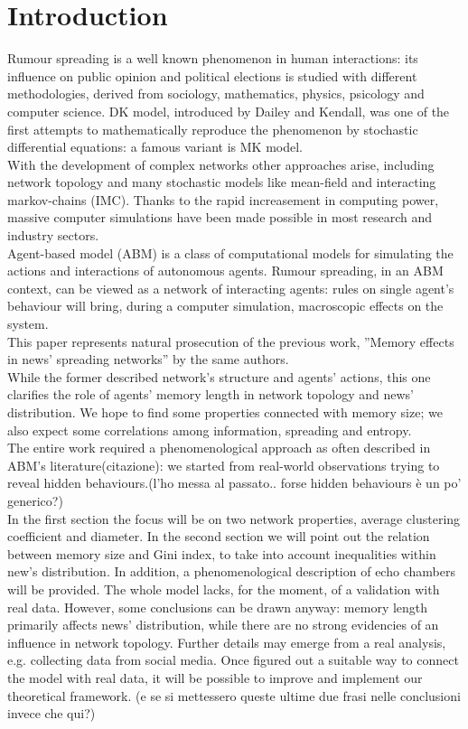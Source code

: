 \section{Introduction} \label{introduction}
Rumour spreading is a well known phenomenon in human interactions:
its influence on public opinion\cite{publicoprumsp} and political
elections\cite{politicalrumsp} is studied with different
methodologies, derived from sociology, mathematics,
physics, psicology and computer science.
DK model,\cite{DKmodel} introduced by Dailey and Kendall, was one of
the first attempts to mathematically reproduce the phenomenon by
stochastic differential equations: a famous variant is MK
model.\cite{MKmodel}\\
With the development of complex networks other approaches arise,
including network topology and many stochastic models
like mean-field\cite{meanfield} and interacting markov-chains\cite{IMC} (IMC).
Thanks to the rapid increasement in computing power,
massive computer simulations have been made possible in
most research and industry sectors.\\
Agent-based model (ABM) is a class of computational models for
simulating the actions and interactions of autonomous
agents.\cite{Agentbased}
Rumour spreading, in an ABM context, can be viewed as a network
of interacting agents: rules on single agent's behaviour
will bring, during a computer simulation, macroscopic
effects on the system.\\
This paper represents natural prosecution of the previous work,
''Memory effects in news' spreading networks'' by the same
authors.\cite{ourpaper}\\
While the former described network's structure and agents' actions,
this one clarifies the role of agents' memory length in network
topology and news' distribution.
We hope to find some properties connected with memory size;
we also expect some correlations among information,
spreading and entropy.\\
The entire work required a phenomenological approach as often described in
ABM's literature(citazione): we started from real-world observations trying
to reveal hidden behaviours.(l'ho messa al passato.. forse hidden behaviours è un po' generico?)\\
 In the first section the focus will be on two network properties, average clustering coefficient
and diameter. In the second section we will point out the relation
between memory size and Gini index, to take into account inequalities
within new's distribution.
In addition, a phenomenological description of echo chambers
will be provided.
The whole model lacks, for the moment, of a validation with real data.
However, some conclusions can be drawn anyway: memory length
primarily affects news' distribution, while there are no strong
evidencies of an influence in network topology.
Further details may emerge from a real analysis, e.g. collecting data
from social media. Once figured out a suitable way to connect the model with
real data, it will be possible to improve and implement
our theoretical framework. (e se si mettessero queste ultime due frasi
 nelle conclusioni invece che qui?)

